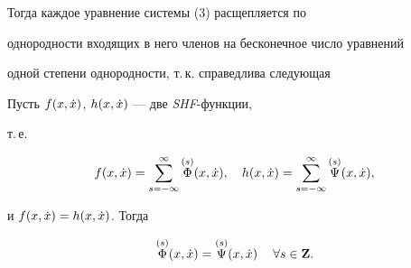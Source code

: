 Тогда каждое уравнение системы (3) расщепляется по 


однородности входящих в него членов на бесконечное число уравнений 


одной степени однородности, т.\,к. справедлива следующая





\begin{lemnonum} Пусть $f(x,\Dot x)$, $h(x,\Dot x)$ --- две {\em SHF}-функции,


т.\,е.


$$


f(x,\xt) = \sum^{\infty}_{s=-\infty}\up{\Phi}{(s)}(x,\xt),\quad


h(x,\xt) = \sum^{\infty}_{s=-\infty}\up{\Psi}{(s)}(x,\xt),


$$


и $f(x,\Dot x) = h(x,\Dot x)$. Тогда


$$


\up{\Phi}{(s)}(x,\xt) = \up{\Psi}{(s)}(x,\xt) \ \; 


\ \; \forall s \in {\bold Z}.


$$


\end{lemnonum}





